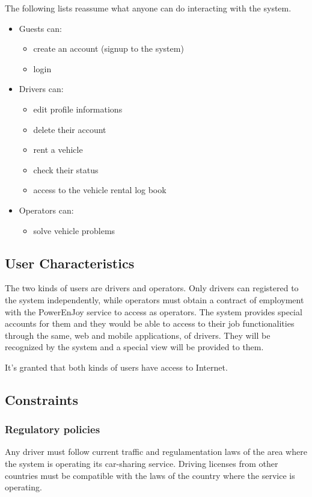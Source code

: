 The following lists reassume what anyone can do interacting with the system.
\begin{itemize}
	\item Guests can:
	\begin{itemize}
		\item create an account (signup to the system)
		\item login
	\end{itemize}
	\item Drivers can:
	\begin{itemize}
		\item edit profile informations
		\item delete their account
		\item rent a vehicle
		\item check their status
		\item access to the vehicle rental log book
	\end{itemize}
	\item Operators can:
	\begin{itemize}
		\item solve vehicle problems
	\end{itemize}
\end{itemize}

\subsection{User Characteristics}
The two kinds of users are drivers and operators. Only drivers can registered to the system independently, while operators must obtain a contract of employment with the PowerEnJoy service to access as operators. The system provides special accounts for them and they would be able to access to their job functionalities through the same, web and mobile applications, of drivers. They will be recognized by the system and a special view will be provided to them.

It's granted that both kinds of users have access to Internet.

\subsection{Constraints}

\subsubsection{Regulatory policies}
Any driver must follow current traffic and regulamentation laws of the area where the system is operating its car-sharing service. Driving licenses from other countries must be compatible with the laws of the country where the service is operating.

